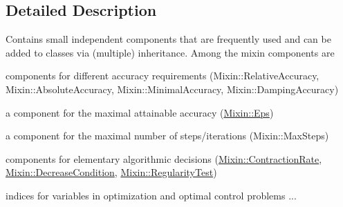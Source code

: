 \subsection{Detailed Description}
Contains small independent components that are frequently used and can be added to classes via (multiple) inheritance. Among the mixin components are
\begin{DoxyItemize}
\item components for different accuracy requirements (Mixin\-::\-Relative\-Accuracy, Mixin\-::\-Absolute\-Accuracy, Mixin\-::\-Minimal\-Accuracy, Mixin\-::\-Damping\-Accuracy)
\item a component for the maximal attainable accuracy (\hyperlink{classSpacy_1_1Mixin_1_1Eps}{Mixin\-::\-Eps})
\item a component for the maximal number of steps/iterations (Mixin\-::\-Max\-Steps)
\item components for elementary algorithmic decisions (\hyperlink{classSpacy_1_1Mixin_1_1ContractionRate}{Mixin\-::\-Contraction\-Rate}, \hyperlink{classSpacy_1_1Mixin_1_1DecreaseCondition}{Mixin\-::\-Decrease\-Condition}, \hyperlink{classSpacy_1_1Mixin_1_1RegularityTest}{Mixin\-::\-Regularity\-Test})
\item indices for variables in optimization and optimal control problems ... 
\end{DoxyItemize}